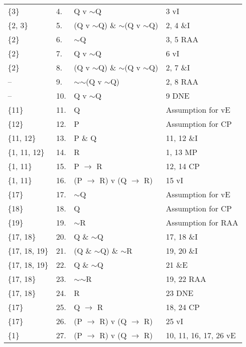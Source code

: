 \documentclass[a4paper,12pt]{article}
\newcommand{\ra}{$\rightarrow$ }
\newcommand{\s}{$\sim$}
\begin{document}
\begin{enumerate}[label=\arabic*,leftmargin=*]
\begin{enumerate}[label=\arabic*.]
\begin{minipage}{\textwidth}
\begin{tabular}{l l l l}
                        \{3\} & 4. & Q v \s Q & 3 vI\\
                        \{2, 3\} & 5. & (Q v \s Q) \& \s (Q v \s Q) & 2, 4 \&I\\
                        \{2\} & 6. & \s Q & 3, 5 RAA\\
                        \{2\} & 7. & Q v \s Q & 6 vI\\
                        \{2\} & 8. & (Q v \s Q) \& \s (Q v \s Q) & 2, 7 \&I\\
                        -- & 9. & \s \s (Q v \s Q) & 2, 8 RAA\\
                        -- & 10. & Q v \s Q & 9 DNE\\
                        \{11\} & 11. & Q & Assumption for vE\\
                        \{12\} & 12. & P & Assumption for CP\\
                        \{11, 12\} & 13. & P \& Q & 11, 12 \&I\\
                        \{1, 11, 12\} & 14. & R & 1, 13 MP\\
                        \{1, 11\} & 15. & P \ra R & 12, 14 CP\\
                        \{1, 11\} & 16. & (P \ra R) v (Q \ra R) & 15 vI\\
                        \{17\} & 17. & \s Q & Assumption for vE\\
                        \{18\} & 18. & Q & Assumption for CP\\
                        \{19\} & 19. & \s R & Assumption for RAA\\
                        \{17, 18\} & 20. & Q \& \s Q & 17, 18 \&I\\
                        \{17, 18, 19\} & 21. & (Q \& \s Q) \& \s R & 19, 20 \&I\\
                        \{17, 18, 19\} & 22. & Q \& \s Q & 21 \&E\\
                        \{17, 18\} & 23. & \s \s R & 19, 22 RAA\\
                        \{17, 18\} & 24. & R & 23 DNE\\
                        \{17\} & 25. & Q \ra R & 18, 24 CP\\
                        \{17\} & 26. & (P \ra R) v (Q \ra R) & 25 vI\\
                        \{1\} & 27. & (P \ra R) v (Q \ra R) & 10, 11, 16, 17, 26 vE\\
                    \end{tabular}
                \end{minipage}

        \end{enumerate}
    \end{enumerate}
\end{document}
